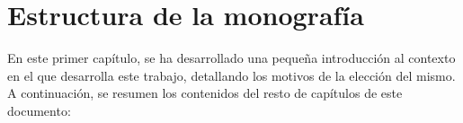 \begin{enumerate}
	
	
	
	
	
	
	
	

\end{enumerate}


\section{Estructura de la monografía}


En este primer capítulo, se ha desarrollado una pequeña introducción al contexto en el que desarrolla este trabajo, detallando los motivos de la elección del mismo. A continuación, se resumen los contenidos del resto de capítulos de este documento:



